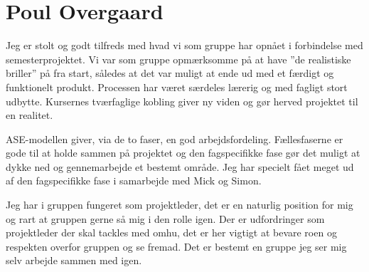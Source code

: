 \section{Poul Overgaard}
Jeg er stolt og godt tilfreds med hvad vi som gruppe har opnået i forbindelse med semesterprojektet. Vi var som gruppe opmærksomme på at have ''de realistiske briller'' på fra start, således at det var muligt at ende ud med et færdigt og funktionelt produkt.
Processen har været særdeles lærerig og med fagligt stort udbytte. Kursernes tværfaglige kobling giver ny viden og gør herved projektet til en realitet. 

ASE-modellen giver, via de to faser, en god arbejdsfordeling. Fællesfaserne er gode til at holde sammen på projektet og den fagspecifikke fase gør det muligt at dykke ned og gennemarbejde et bestemt område. Jeg har specielt fået meget ud af den fagspecifikke fase i samarbejde med Mick og Simon.  

Jeg har i gruppen fungeret som projektleder, det er en naturlig position for mig og rart at gruppen gerne så mig i den rolle igen. Der er udfordringer som projektleder der skal tackles med omhu, det er her vigtigt at bevare roen og respekten overfor gruppen og se fremad. Det er bestemt en gruppe jeg ser mig selv arbejde sammen med igen. 